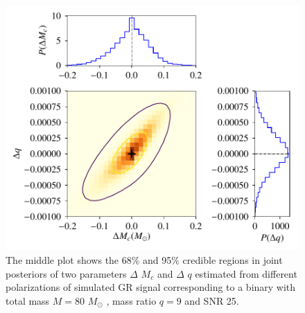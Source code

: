 \documentclass[prd,preprintnumbers,twocolumn,eqsecnum,floatfix,a4paper,nofootinbib,superscriptaddress]{revtex4}
\begin{document}
\begin{figure}[h]
    \begin{center}
    \includegraphics[scale=0.55]{figs/hp_hc_consistency_triangle_plot_delMc_delq_M_80_q_9_snr_25_pol.pdf} 
    \end{center} 
    \caption{The middle plot shows the 68\% and 95\% credible regions in joint posteriors of two parameters $\Delta$ $M_{c}$ and $\Delta$ $q$ estimated from different polarizations of simulated GR signal corresponding to a binary with total mass $M=80$ $M_{\odot}$ , mass ratio $q=9$ and SNR 25.}
    \label{fig:hphc_triangle}
\end{figure}
\end{document}
